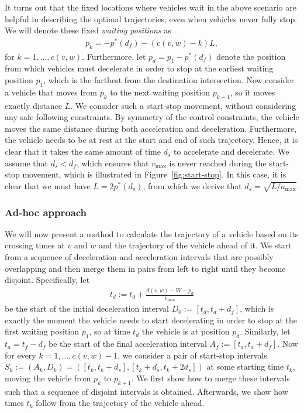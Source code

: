 \documentclass[a4paper]{article}
\theoremstyle{definition}
\theoremstyle{plain}
\begin{document}
It turns out that the fixed locations where vehicles wait in the above scenario
are helpful in describing the optimal trajectories, even when vehicles never
fully stop. We will denote these fixed \textit{waiting positions} as
\begin{align*}
  p_{k} = - p^{*}(d_{f}) - (c(v,w) - k) L,
\end{align*}
for $k = 1, \dots, c(v,w)$.
%
Furthermore, let $p_{d} = p_{1} - p^{*}(d_{f})$ denote the position from
which vehicles must decelerate in order to stop at the earliest waiting position
$p_{1}$, which is the farthest from the destination intersection.
%
Now consider a vehicle that moves from $p_{k}$ to the next waiting position
$p_{k+1}$, so it moves exactly distance $L$. We consider such a start-stop
movement, without considering any safe following constraints. By symmetry of the
control constraints, the vehicle moves the same distance during both
acceleration and deceleration. Furthermore, the vehicle needs to be at rest at
the start and end of such trajectory. Hence, it is clear that it takes the same
amount of time $d_{s}$ to accelerate and decelerate. We assume that
$d_{s} < d_{f}$, which ensures that $v_{\max}$ is never reached during the
start-stop movement, which is illustrated in Figure~\ref{fig:start-stop}. In this case, it is
clear that we must have $L = 2 p^{*}(d_{s})$, from which we derive that
$d_{s} = \sqrt{L / a_{\max}}$.

\subsubsection{Ad-hoc approach}
We will now present a method to calculate the trajectory of a vehicle based on
its crossing times at $v$ and $w$ and the trajectory of the vehicle ahead of it.
We start from a sequence of deceleration and acceleration intervals that are
possibly overlapping and then merge them in pairs from left to right until they
become disjoint.
%
Specifically, let
\begin{align*}
  t_{d} := t_{0} + \frac{d(v,w) - W - p_{d}}{v_{\max}}
\end{align*}
be the start of the initial deceleration interval
$D_{0} := [t_{d}, t_{d} + d_{f}]$, which is exactly the moment the vehicle needs
to start decelerating in order to stop at the first waiting position $p_{1}$, so
at time $t_{d}$ the vehicle is at position $p_{d}$. Similarly, let
$t_{a} = t_{f} - d_{f}$ be the start of the final acceleration interval
$A_{f} := [t_{a}, t_{a} + d_{f}]$. Now for every $k = 1, \dots, c(v,w) - 1$, we
consider a pair of start-stop intervals
$S_{k} := (A_{k}, D_{k}) = ([t_{k}, t_{k} + d_{s}], [t_{k} + d_{s}, t_{k} + 2 d_{s}])$
at some starting time $t_{k}$, moving the vehicle from $p_{k}$ to $p_{k+1}$. We
first show how to merge these intervals such that a sequence of disjoint
intervals is obtained. Afterwards, we show how times $t_{k}$ follow from the
trajectory of the vehicle ahead.
\end{document}
